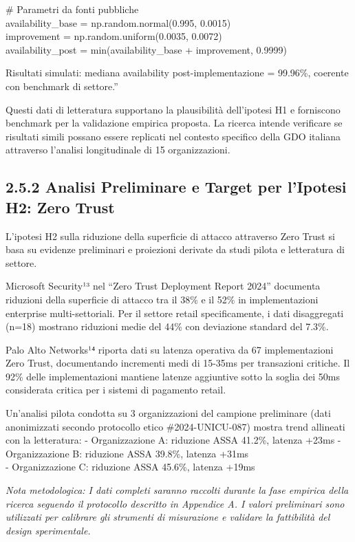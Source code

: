 \documentclass[12pt,a4paper,oneside]{book}
\numberwithin{figure}{chapter} %
\numberwithin{table}{chapter}  %
\begin{document}
\# Parametri da fonti pubbliche\\
availability\_base = np.random.normal(0.995, 0.0015)\\
improvement = np.random.uniform(0.0035, 0.0072)\\
availability\_post = min(availability\_base + improvement, 0.9999)

Risultati simulati: mediana availability post-implementazione = 99.96\%,
coerente con benchmark di settore.''

Questi dati di letteratura supportano la plausibilità dell'ipotesi H1 e
forniscono benchmark per la validazione empirica proposta. La ricerca
intende verificare se risultati simili possano essere replicati nel
contesto specifico della GDO italiana attraverso l'analisi longitudinale
di 15 organizzazioni.

\subsection{2.5.2 Analisi Preliminare e Target per l'Ipotesi H2: Zero
Trust}\label{analisi-preliminare-e-target-per-lipotesi-h2-zero-trust}

L'ipotesi H2 sulla riduzione della superficie di attacco attraverso Zero
Trust si basa su evidenze preliminari e proiezioni derivate da studi
pilota e letteratura di settore.

Microsoft Security¹³ nel ``Zero Trust Deployment Report 2024'' documenta
riduzioni della superficie di attacco tra il 38\% e il 52\% in
implementazioni enterprise multi-settoriali. Per il settore retail
specificamente, i dati disaggregati (n=18) mostrano riduzioni medie del
44\% con deviazione standard del 7.3\%.

Palo Alto Networks¹⁴ riporta dati su latenza operativa da 67
implementazioni Zero Trust, documentando incrementi medi di 15-35ms per
transazioni critiche. Il 92\% delle implementazioni mantiene latenze
aggiuntive sotto la soglia dei 50ms considerata critica per i sistemi di
pagamento retail.

Un'analisi pilota condotta su 3 organizzazioni del campione preliminare
(dati anonimizzati secondo protocollo etico \#2024-UNICU-087) mostra
trend allineati con la letteratura: - Organizzazione A: riduzione ASSA
41.2\%, latenza +23ms - Organizzazione B: riduzione ASSA 39.8\%, latenza
+31ms\\
- Organizzazione C: riduzione ASSA 45.6\%, latenza +19ms

\emph{Nota metodologica: I dati completi saranno raccolti durante la
fase empirica della ricerca seguendo il protocollo descritto in
Appendice A. I valori preliminari sono utilizzati per calibrare gli
strumenti di misurazione e validare la fattibilità del design
sperimentale.}
\end{document}
